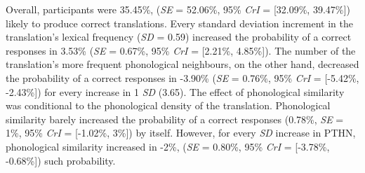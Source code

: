 \documentclass[
  english,
  man,floatsintext]{apa6}
\begin{document}
Overall, participants were 35.45\%, (\emph{SE} = 52.06\%, 95\% \emph{CrI} = {[}32.09\%, 39.47\%{]}) likely to produce correct translations. Every standard deviation increment in the translation's lexical frequency (\emph{SD} = 0.59) increased the probability of a correct responses in 3.53\% (\emph{SE} = 0.67\%, 95\% \emph{CrI} = {[}2.21\%, 4.85\%{]}). The number of the translation's more frequent phonological neighbours, on the other hand, decreased the probability of a correct responses in -3.90\% (\emph{SE} = 0.76\%, 95\% \emph{CrI} = {[}-5.42\%, -2.43\%{]}) for every increase in 1 \emph{SD} (3.65). The effect of phonological similarity was conditional to the phonological density of the translation. Phonological similarity barely increased the probability of a correct responses (0.78\%, \emph{SE} = 1\%, 95\% \emph{CrI} = {[}-1.02\%, 3\%{]}) by itself. However, for every \emph{SD} increase in PTHN, phonological similarity increased in -2\%, (\emph{SE} = 0.80\%, 95\% \emph{CrI} = {[}-3.78\%, -0.68\%{]}) such probability.
\end{document}
